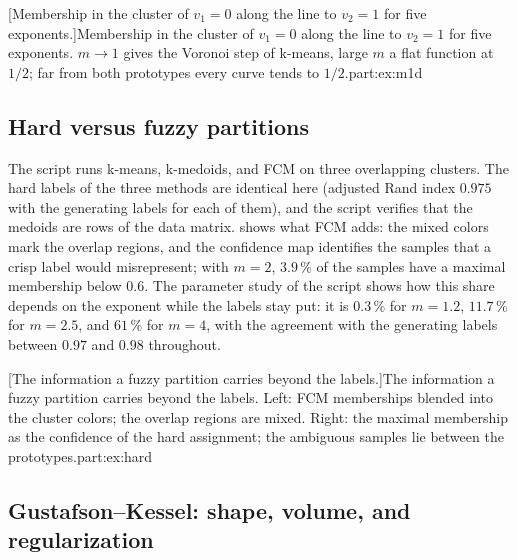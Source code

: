 [Membership in the cluster of $v_1=0$ along the line to $v_2=1$ for five exponents.]{Membership in the cluster of $v_1=0$ along the line to $v_2=1$ for five exponents. $m\to1$ gives the Voronoi step of k-means, large $m$ a flat function at $1/2$; far from both prototypes every curve tends to $1/2$.}{part:ex:m1d}

\subsection{Hard versus fuzzy partitions}\label{sec:part:ex:hard}

The script  runs k-means, k-medoids, and FCM on three overlapping clusters. The hard labels of the three methods are identical here (adjusted Rand index $0.975$ with the generating labels for each of them), and the script verifies that the medoids are rows of the data matrix.  shows what FCM adds: the mixed colors mark the overlap regions, and the confidence map identifies the samples that a crisp label would misrepresent; with $m=2$, $3.9\,\%$ of the samples have a maximal membership below $0.6$. The parameter study of the script shows how this share depends on the exponent while the labels stay put: it is $0.3\,\%$ for $m=1.2$, $11.7\,\%$ for $m=2.5$, and $61\,\%$ for $m=4$, with the agreement with the generating labels between $0.97$ and $0.98$ throughout.

[The information a fuzzy partition carries beyond the labels.]{The information a fuzzy partition carries beyond the labels. Left: FCM memberships blended into the cluster colors; the overlap regions are mixed. Right: the maximal membership as the confidence of the hard assignment; the ambiguous samples lie between the prototypes.}{part:ex:hard}

\subsection{Gustafson--Kessel: shape, volume, and regularization}\label{sec:part:ex:gk}

